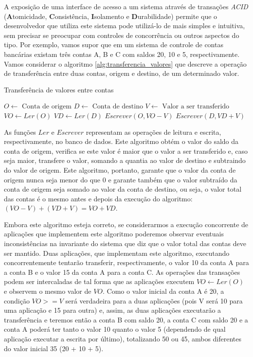 \documentclass[11pt,twoside,a4paper]{book}
\begin{document}
A exposição de uma interface de acesso a um sistema através de transações \emph{ACID} (\textbf{A}tomicidade, \textbf{C}onsistência, \textbf{I}solamento e \textbf{D}urabilidade) permite que o desenvolvedor que utiliza este sistema pode utilizá-lo de mais simples e intuitiva, sem precisar se preocupar com controles de concorrência ou outros aspectos do tipo. Por exemplo, vamos supor que em um sistema de controle de contas bancárias existam três contas A, B e C com saldos 20, 10 e 5, respectivamente. Vamos considerar o algoritmo \ref{alg:transferencia_valores} que descreve a operação de transferência entre duas contas, origem e destino, de um determinado valor.

\begin{algorithm}
\caption{Transferência de valores entre contas}
\label{alg:transferencia_valores}
\begin{algorithmic}[1]
\State $O \gets \text{ Conta de origem}$
\State $D \gets \text{ Conta de destino}$
\State $V \gets \text{ Valor a ser transferido}$
\State $VO \gets Ler(O)$
	\State $VD \gets Ler(D)$
	\State $Escrever(O, VO - V)$
	\State $Escrever(D, VD + V)$
\EndIf
\end{algorithmic}
\end{algorithm}

As funções $Ler$ e $Escrever$ representam as operações de leitura e escrita, respectivamente, no banco de dados. Este algoritmo obtém o valor do saldo da conta de origem, verifica se este valor é maior que o valor a ser transferido e, caso seja maior, transfere o valor, somando a quantia ao valor de destino e subtraindo do valor de origem. Este algoritmo, portanto, garante que o valor da conta de origem nunca seja menor do que 0 e garante também que o valor subtraído da conta de origem seja somado ao valor da conta de destino, ou seja, o valor total das contas é o mesmo antes e depois da execução do algoritmo: $(VO - V) + (VD + V) = VO + VD$.

Embora este algoritmo esteja correto, se considerarmos a execução concorrente de aplicações que implementem este algoritmo poderemos observar eventuais inconsistências na invariante do sistema que diz que o valor total das contas deve ser mantido. Duas aplicações, que implementam este algoritmo, executando concorrentemente tentarão transferir, respectivamente, o valor 10 da conta A para a conta B e o valor 15 da conta A para a conta C. As operações das transações podem ser intercaladas de tal forma que as aplicações executem $VO \gets Ler(O)$ e observem o mesmo valor de $VO$. Como o valor inicial da conta A é 20, a condição $VO >= V$ será verdadeira para a duas aplicações (pois V será 10 para uma aplicação e 15 para outra) e, assim, as duas aplicações executarão a transferência e teremos então a conta B com saldo 20, a conta C com saldo 20 e a conta A poderá ter tanto o valor 10 quanto o valor 5 (dependendo de qual aplicação executar a escrita por último), totalizando 50 ou 45, ambos diferentes do valor inicial 35 (20 + 10 + 5).
\end{document}
